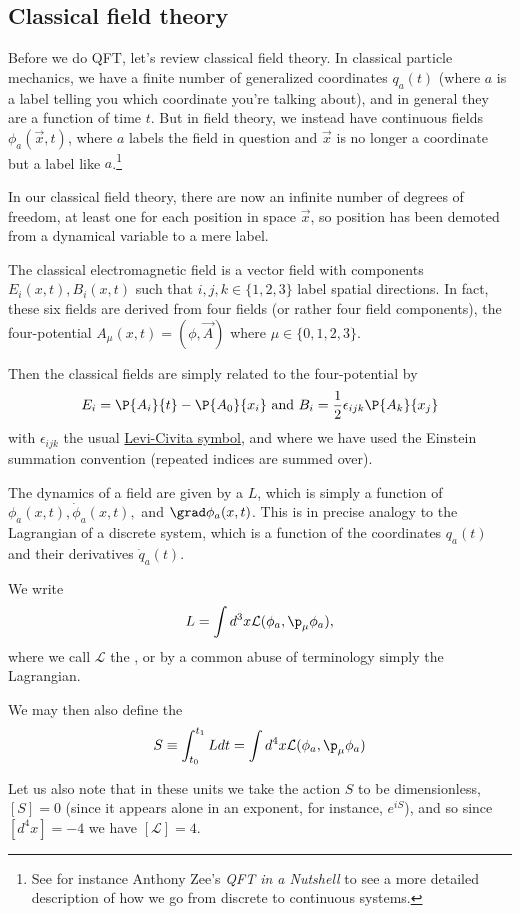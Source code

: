 \subsection*{Classical field theory} Before we do QFT, let's review classical field theory. In classical particle mechanics, we have a finite number of generalized coordinates $q_a(t)$ (where $a$ is a label telling you which coordinate you're talking about), and in general they are a function of time $t$. But in field theory, we instead have continuous fields $\phi_a(\vec{x},t)$, where $a$ labels the field in question and $\vec x$ is no longer a coordinate but a label like $a$.\footnote{See for instance Anthony Zee's \textit{QFT in a Nutshell} to see a more detailed description of how we go from discrete to continuous systems.}

In our classical field theory, there are now an infinite number of degrees of freedom, at least one for each position in space $\vec x$, so position has been demoted from a dynamical variable to a mere label.

\begin{exm}
The classical electromagnetic field is a vector field with components $E_i(x,t), B_i(x,t)$ such that $i,j,k\in \{1,2,3\}$ label spatial directions. In fact, these six fields are derived from four fields (or rather four field components), the four-potential $A_\mu(x,t)=(\phi,\vec{A})$ where $\mu\in\{0,1,2,3\}$.

Then the classical fields are simply related to the four-potential by
\begin{equation}
E_i=\P{A_i}{t}-\P{A_0}{x_i} \text{ and } B_i=\frac{1}{2}\epsilon_{ijk} \P{A_k}{x_j}
\end{equation}
with $\epsilon_{ijk}$ the usual \href{https://en.wikipedia.org/wiki/Levi-Civita_symbol}{Levi-Civita symbol}, and where we have used the Einstein summation convention (repeated indices are summed over).
\end{exm}

The dynamics of a field are given by a  $L$, which is simply a function of $\phi_a(x,t), \dot \phi_a(x,t),$ and $\grad \phi_a(x,t)$. This is in precise analogy to the Lagrangian of a discrete system, which is a function of the coordinates $q_a(t)$ and their derivatives $\dot q_a(t)$.
\begin{defn}
We write
\begin{equation}
L=\int d^3 x \mathcal{L}(\phi_a, \p_\mu \phi_a),
\end{equation}
where we call $\mathcal{L}$ the , or by a common abuse of terminology simply the Lagrangian.
\end{defn}
\begin{defn}
We may then also define the 
\begin{equation}
S\equiv \int_{t_0}^{t_1}L dt = \int d^4x \mathcal{L}(\phi_a,\p_\mu \phi_a)
\end{equation}
\end{defn}
Let us also note that in these units we take the action $S$ to be dimensionless, $[S]=0$ (since it appears alone in an exponent, for instance, $e^{iS}$), and so since $[d^4x]=-4$ we have $[\mathcal{L}]=4.$

